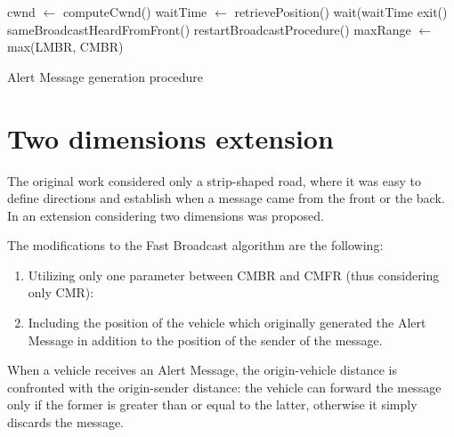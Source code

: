 		\begin{algorithm}[H]
			\begin{algorithmic}[1]
				\State cwnd $\gets$ computeCwnd()
				\State waitTime $\gets$ retrievePosition()
				\State wait(waitTime
				\State exit()
				\ElsIf sameBroadcastHeardFromFront()
				\State restartBroadcastProcedure()
				\Else 
				\State maxRange $\gets$ max(LMBR, CMBR)
				\EndIf 
			\end{algorithmic}
			\caption{Alert Message generation procedure}
			\label{alg:alert-message-forwarding}
		\end{algorithm}
	
	\section{Two dimensions extension}
		The original work \cite{4199282} considered only a strip-shaped road, where it was easy to define directions and establish 	when a message came from the front or the back. In \cite{BAR2017} an extension considering two dimensions was proposed. 
		
		
		The modifications to the Fast Broadcast algorithm are the following:
		\begin{enumerate}
			\item Utilizing only one parameter between CMBR and CMFR (thus considering only CMR):
			\item Including the position of the vehicle which originally generated the Alert Message in addition to the position of the sender of the message.
		\end{enumerate}
		
		
		When a vehicle receives an Alert Message, the origin-vehicle distance is confronted with the origin-sender distance: the vehicle can forward the message only if the former is greater than or equal to the latter, otherwise it simply discards the message.
		


